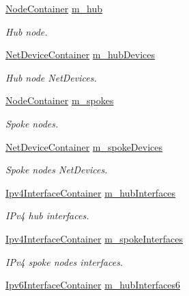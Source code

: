 \begin{DoxyCompactItemize}
\item 
\hyperlink{classns3_1_1NodeContainer}{Node\+Container} \hyperlink{classns3_1_1PointToPointStarHelper_a1bafb25c439c0dff7ec42760b22a2435}{m\+\_\+hub}
\begin{DoxyCompactList}\small\item\em Hub node. \end{DoxyCompactList}\item 
\hyperlink{classns3_1_1NetDeviceContainer}{Net\+Device\+Container} \hyperlink{classns3_1_1PointToPointStarHelper_a5313e751bdac4773572dd205648137a8}{m\+\_\+hub\+Devices}
\begin{DoxyCompactList}\small\item\em Hub node Net\+Devices. \end{DoxyCompactList}\item 
\hyperlink{classns3_1_1NodeContainer}{Node\+Container} \hyperlink{classns3_1_1PointToPointStarHelper_a4f501e83d42c3b830f41c85621893737}{m\+\_\+spokes}
\begin{DoxyCompactList}\small\item\em Spoke nodes. \end{DoxyCompactList}\item 
\hyperlink{classns3_1_1NetDeviceContainer}{Net\+Device\+Container} \hyperlink{classns3_1_1PointToPointStarHelper_afabb8aa72a271404471be4f1bc46bbf4}{m\+\_\+spoke\+Devices}
\begin{DoxyCompactList}\small\item\em Spoke nodes Net\+Devices. \end{DoxyCompactList}\item 
\hyperlink{classns3_1_1Ipv4InterfaceContainer}{Ipv4\+Interface\+Container} \hyperlink{classns3_1_1PointToPointStarHelper_a7dbc2d0d1a3f35e648695738a8a5027d}{m\+\_\+hub\+Interfaces}
\begin{DoxyCompactList}\small\item\em I\+Pv4 hub interfaces. \end{DoxyCompactList}\item 
\hyperlink{classns3_1_1Ipv4InterfaceContainer}{Ipv4\+Interface\+Container} \hyperlink{classns3_1_1PointToPointStarHelper_a71d76c86976f14e2b4781e5ef9bb5b37}{m\+\_\+spoke\+Interfaces}
\begin{DoxyCompactList}\small\item\em I\+Pv4 spoke nodes interfaces. \end{DoxyCompactList}\item 
\hyperlink{classns3_1_1Ipv6InterfaceContainer}{Ipv6\+Interface\+Container} \hyperlink{classns3_1_1PointToPointStarHelper_a29e273af092f0c581f1450f6734e2c56}{m\+\_\+hub\+Interfaces6}

\end{DoxyCompactItemize}
